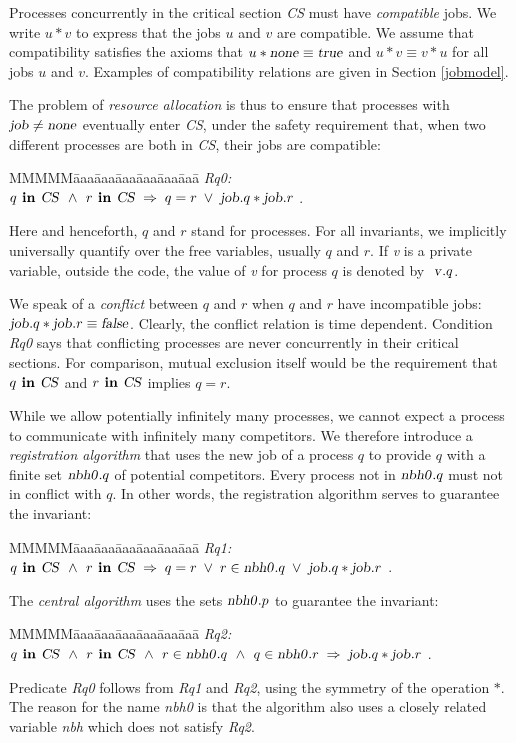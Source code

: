 \documentclass[10pt]{article} \usepackage[english]{babel}
\newenvironment{tab}{\begin{tabbing}
MMMMM\=aaa\=aaa\=aaa\=aaa\=aaa\=aaa\= \kill}{\end{tabbing}}
\def\S #1/{\mbox {\textsl{#1}}}
\def\B #1/{\mbox {\textbf{#1}}}
\def\Implies{\;\Rightarrow\;}
\def\Land   {\mbox{ $\;\land\;$ }}
\def\Lor    {\;\lor\;}
\def\true   {\S true/}
\def\false  {\S false/}
\begin{document}
Processes concurrently in the critical section \S CS/ must have
\emph{compatible} jobs.  We write $u*v$ to express that the jobs $u$
and $v$ are compatible.  We assume that compatibility satisfies the
axioms that $u*\S none/\equiv \true$ and $u*v\equiv v*u$ for all jobs
$u$ and $v$.  Examples of compatibility relations are given in Section
\ref{jobmodel}.

The problem of \emph{resource allocation} is thus to ensure that
processes with $\S job/\ne\S none/$ eventually enter \S CS/, under
the safety requirement that, when two different processes are both in
\S CS/, their jobs are compatible:
\begin{tab}
\S Rq0:/ \> $q\B\ in /\S CS/\Land r\B\ in /\S CS/ \Implies q = r \Lor
\S job/.q * \S job/.r $ .
\end{tab}
Here and henceforth, $q$ and $r$ stand for processes.  For all
invariants, we implicitly universally quantify over the free
variables, usually $q$ and $r$.  If \S v/ is a private variable,
outside the code, the value of \S v/ for process $q$ is denoted by $\S
v/.q$.

We speak of a \emph{conflict} between $q$ and $r$ when $q$ and $r$
have incompatible jobs: $\S job/.q * \S job/.r \equiv \false $.
Clearly, the conflict relation is time dependent.  Condition \S Rq0/
says that conflicting processes are never concurrently in their
critical sections.  For comparison, mutual exclusion itself would be
the requirement that $ q\B\ in /\S CS/$ and $r\B\ in /\S CS/$ implies
$ q = r $.

While we allow potentially infinitely many processes, we cannot expect
a process to communicate with infinitely many competitors.  We
therefore introduce a \emph{registration algorithm} that uses the new
job of a process $q$ to provide $q$ with a finite set $\S nbh0/.q$ of
potential competitors.  Every process not in $\S nbh0/.q$ must not in
conflict with $q$.  In other words, the registration algorithm serves
to guarantee the invariant:
\begin{tab}
\S Rq1:/ \> $ q\B\ in /\S CS/ \Land r\B\ in /\S CS/ \Implies
q = r \Lor r\in\S nbh0/.q \Lor \S job/.q * \S job/.r $ .
\end{tab}
The \emph{central algorithm} uses the sets $\S nbh0/.p$ to guarantee
the invariant:
\begin{tab}
\S Rq2:/ \> $ q\B\ in /\S CS/\Land r\B\ in /\S CS/ \Land 
r\in\S nbh0/.q\Land q\in\S nbh0/.r \Implies 
\S job/.q * \S job/.r $ .
\end{tab}
Predicate \S Rq0/ follows from \S Rq1/ and \S Rq2/, using the symmetry
of the operation $*$.  The reason for the name \S nbh0/ is that the
algorithm also uses a closely related variable \S nbh/ which does not
satisfy \S Rq2/.
\end{document}
